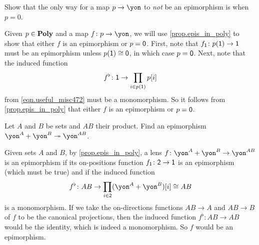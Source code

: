 \documentclass[Book-Poly]{subfiles}
\begin{document}

\begin{exercise}
Show that the only way for a map $p\to\yon$ to \emph{not} be an epimorphism is when $p=0$.
\begin{solution}
Given $p \in \mathbf{Poly}$ and a map $f \colon p \to \yon$, we will use \cref{prop.epis_in_poly} to show that either $f$ is an epimorphism or $p = \textsf{0}$.
First, note that $f_{\textsf{1}} \colon p(\textsf{1}) \to \textsf{1}$ must be an epimorphism unless $p(\textsf{1}) \cong \textsf{0}$, in which case $p = \textsf{0}$.
Next, note that the induced function
\[
    f^\flat \colon \textsf{1} \to \prod_{i\in p(\textsf{1})} p[i]
\]
from \eqref{eqn.useful_misc472} must be a monomorphism.
So it follows from \cref{prop.epis_in_poly} that either $f$ is an epimorphism or $p = \textsf{0}$.
\end{solution}
\end{exercise}

\begin{exercise}
Let $A$ and $B$ be sets and $AB$ their product. Find an epimorphism $\yon^A+\yon^B\surj\yon^{AB}$.
\begin{solution}
Given sets $A$ and $B$, by \cref{prop.epis_in_poly}, a lens $f \colon \yon^A + \yon^B \to \yon^{AB}$ is an epimorphism if its on-positions function $f_{\textsf{1}} \colon \textsf{2} \to \textsf{1}$ is an epimorphism (which must be true) and if the induced function
\[
    f^\flat \colon AB \to \prod_{i \in \2} (\yon^A + \yon^B)[i] \iso AB
\]
is a monomorphism.
If we take the on-directions functions $AB \to A$ and $AB \to B$ of $f$ to be the canonical projections, then the induced function $f^\flat \colon AB \to AB$ would be the identity, which is indeed a monomorphism.
So $f$ would be an epimorphism.
\end{solution}
\end{exercise}
\end{document}
